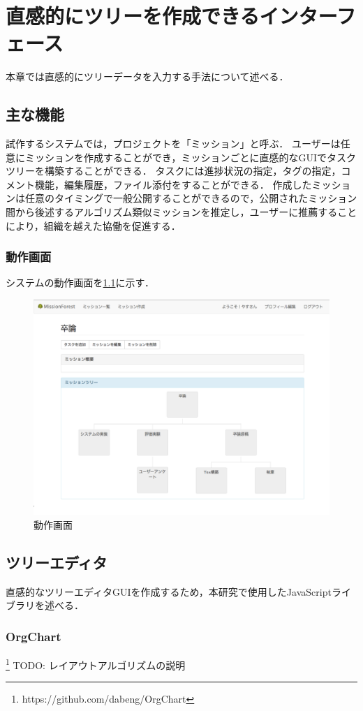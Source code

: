 \chapter{直感的にツリーを作成できるインターフェース}
本章では直感的にツリーデータを入力する手法について述べる．

\section{主な機能}
試作するシステムでは，プロジェクトを「ミッション」と呼ぶ．
ユーザーは任意にミッションを作成することができ，ミッションごとに直感的なGUIでタスクツリーを構築することができる．
タスクには進捗状況の指定，タグの指定，コメント機能，編集履歴，ファイル添付をすることができる．
作成したミッションは任意のタイミングで一般公開することができるので，公開されたミッション間から後述するアルゴリズム類似ミッションを推定し，ユーザーに推薦することにより，組織を越えた協働を促進する．

\subsection{動作画面}
システムの動作画面を\ref{img:intereface_capture}に示す．

\begin{figure}[t]
	\begin{center}
		\includegraphics[width=0.9\linewidth]{assets/img/interface_capture.png}
		\caption{動作画面}
		\label{img:intereface_capture}
	\end{center}
\end{figure}

\section{ツリーエディタ}
直感的なツリーエディタGUIを作成するため，本研究で使用したJavaScriptライブラリを述べる．

\subsection{OrgChart}
\footnote{https://github.com/dabeng/OrgChart}
TODO: レイアウトアルゴリズムの説明
